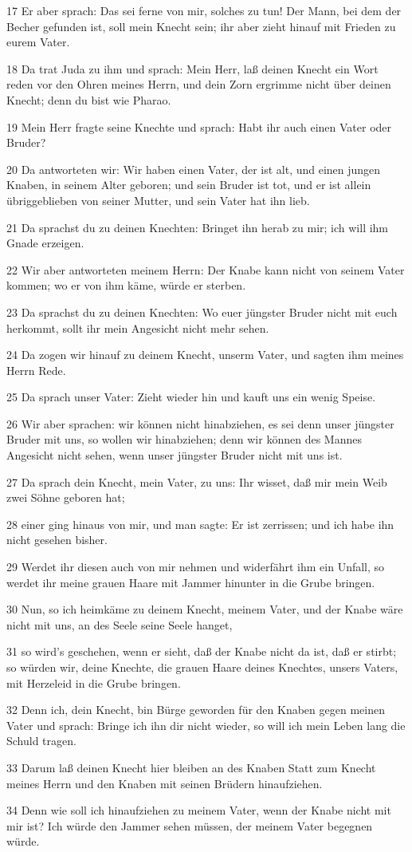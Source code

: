 \par 17 Er aber sprach: Das sei ferne von mir, solches zu tun! Der Mann, bei dem der Becher gefunden ist, soll mein Knecht sein; ihr aber zieht hinauf mit Frieden zu eurem Vater.
\par 18 Da trat Juda zu ihm und sprach: Mein Herr, laß deinen Knecht ein Wort reden vor den Ohren meines Herrn, und dein Zorn ergrimme nicht über deinen Knecht; denn du bist wie Pharao.
\par 19 Mein Herr fragte seine Knechte und sprach: Habt ihr auch einen Vater oder Bruder?
\par 20 Da antworteten wir: Wir haben einen Vater, der ist alt, und einen jungen Knaben, in seinem Alter geboren; und sein Bruder ist tot, und er ist allein übriggeblieben von seiner Mutter, und sein Vater hat ihn lieb.
\par 21 Da sprachst du zu deinen Knechten: Bringet ihn herab zu mir; ich will ihm Gnade erzeigen.
\par 22 Wir aber antworteten meinem Herrn: Der Knabe kann nicht von seinem Vater kommen; wo er von ihm käme, würde er sterben.
\par 23 Da sprachst du zu deinen Knechten: Wo euer jüngster Bruder nicht mit euch herkommt, sollt ihr mein Angesicht nicht mehr sehen.
\par 24 Da zogen wir hinauf zu deinem Knecht, unserm Vater, und sagten ihm meines Herrn Rede.
\par 25 Da sprach unser Vater: Zieht wieder hin und kauft uns ein wenig Speise.
\par 26 Wir aber sprachen: wir können nicht hinabziehen, es sei denn unser jüngster Bruder mit uns, so wollen wir hinabziehen; denn wir können des Mannes Angesicht nicht sehen, wenn unser jüngster Bruder nicht mit uns ist.
\par 27 Da sprach dein Knecht, mein Vater, zu uns: Ihr wisset, daß mir mein Weib zwei Söhne geboren hat;
\par 28 einer ging hinaus von mir, und man sagte: Er ist zerrissen; und ich habe ihn nicht gesehen bisher.
\par 29 Werdet ihr diesen auch von mir nehmen und widerfährt ihm ein Unfall, so werdet ihr meine grauen Haare mit Jammer hinunter in die Grube bringen.
\par 30 Nun, so ich heimkäme zu deinem Knecht, meinem Vater, und der Knabe wäre nicht mit uns, an des Seele seine Seele hanget,
\par 31 so wird's geschehen, wenn er sieht, daß der Knabe nicht da ist, daß er stirbt; so würden wir, deine Knechte, die grauen Haare deines Knechtes, unsers Vaters, mit Herzeleid in die Grube bringen.
\par 32 Denn ich, dein Knecht, bin Bürge geworden für den Knaben gegen meinen Vater und sprach: Bringe ich ihn dir nicht wieder, so will ich mein Leben lang die Schuld tragen.
\par 33 Darum laß deinen Knecht hier bleiben an des Knaben Statt zum Knecht meines Herrn und den Knaben mit seinen Brüdern hinaufziehen.
\par 34 Denn wie soll ich hinaufziehen zu meinem Vater, wenn der Knabe nicht mit mir ist? Ich würde den Jammer sehen müssen, der meinem Vater begegnen würde.

